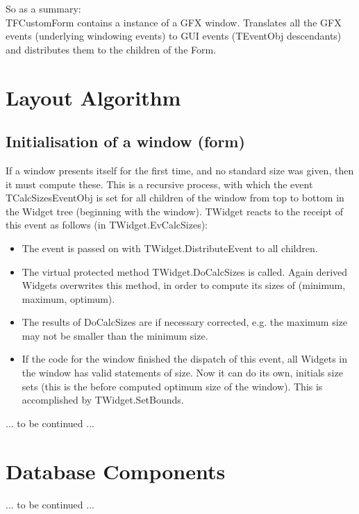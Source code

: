 \documentclass[a4paper,11pt]{report}
\begin{document}
So as a summary:\\
TFCustomForm contains a instance of a GFX window. Translates all the 
GFX events (underlying windowing events) to GUI events (TEventObj 
descendants) and distributes them to the children of the Form.


\chapter{Layout Algorithm}

\section{Initialisation of a window (form)}
If a window presents itself for the first time, and no standard size was
 given, then it must compute these.
 This is a recursive process, with which the event TCalcSizesEventObj is
 set for all children of the window from top to bottom in the Widget tree
 (beginning with the window).
 TWidget reacts to the receipt of this event as follows (in TWidget.EvCalcSizes):

\begin{itemize}
	\item The event is passed on with TWidget.DistributeEvent to all children.
	
	\item The virtual protected method TWidget.DoCalcSizes is called.
 Again derived Widgets overwrites this method, in order to compute its sizes
 of (minimum, maximum, optimum).
 
 	\item The results of DoCalcSizes are if necessary corrected, e.g.
 the maximum size may not be smaller than the minimum size.
 
 	\item If the code for the window finished the dispatch of this event, all Widgets
 in the window has valid statements of size.
 Now it can do its own, initials size sets (this is the before computed
 optimum size of the window).
 This is accomplished by TWidget.SetBounds.
\end{itemize}

... to be continued ...


\chapter{Database Components}

... to be continued ...
\end{document}
